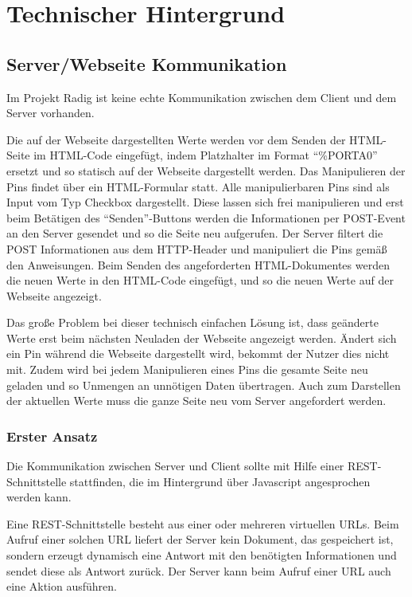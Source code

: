 
\chapter{Technischer Hintergrund}

\section{Server/Webseite Kommunikation}
Im Projekt Radig ist keine echte Kommunikation zwischen dem Client und dem Server
vorhanden.

Die auf der Webseite dargestellten Werte werden vor dem Senden der HTML-Seite
im HTML-Code eingefügt, indem Platzhalter im Format "`\%PORTA0"' ersetzt und so statisch auf
der Webseite dargestellt werden. Das Manipulieren der Pins findet über ein HTML-Formular
statt. Alle manipulierbaren Pins sind als Input vom Typ Checkbox dargestellt. Diese lassen
sich frei manipulieren und erst beim Betätigen des "`Senden"'-Buttons werden die
Informationen per POST-Event an den Server gesendet und so die Seite neu aufgerufen. Der
Server filtert die POST Informationen aus dem HTTP-Header und manipuliert die Pins gemäß
den Anweisungen. Beim Senden des angeforderten HTML-Dokumentes werden die neuen Werte in
den HTML-Code eingefügt, und so die neuen Werte auf der Webseite angezeigt.

Das große Problem bei dieser technisch einfachen Lösung ist, dass geänderte Werte erst beim
nächsten Neuladen der Webseite angezeigt werden. Ändert sich ein Pin während die Webseite
dargestellt wird, bekommt der Nutzer dies nicht mit. Zudem wird bei jedem Manipulieren
eines Pins die gesamte Seite neu geladen und so Unmengen an unnötigen Daten übertragen.
Auch zum Darstellen der aktuellen Werte muss die ganze Seite neu vom Server angefordert
werden.

\subsection{Erster Ansatz}
Die Kommunikation zwischen Server und Client sollte mit Hilfe einer REST-Schnittstelle
stattfinden, die im Hintergrund über Javascript angesprochen werden kann.

Eine REST-Schnittstelle besteht aus einer oder mehreren virtuellen URLs. Beim Aufruf einer
solchen URL liefert der Server kein Dokument, das gespeichert ist, sondern erzeugt
dynamisch eine Antwort mit den benötigten Informationen und sendet diese als Antwort
zurück. Der Server kann beim Aufruf einer URL auch eine Aktion ausführen.

